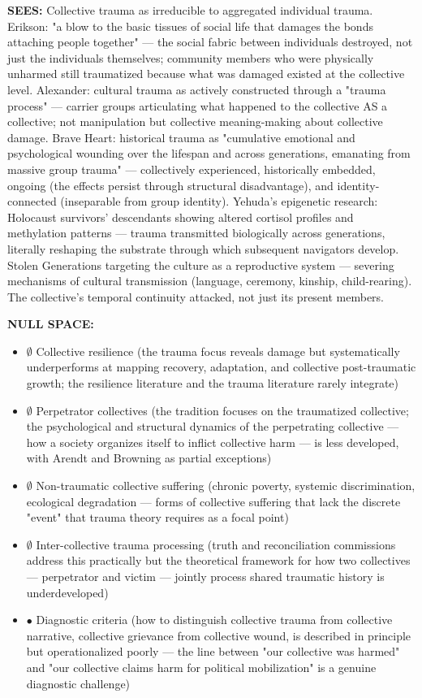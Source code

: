 \textbf{SEES:} Collective trauma as irreducible to aggregated individual trauma. Erikson: "a blow to the basic tissues of social life that damages the bonds attaching people together" — the social fabric between individuals destroyed, not just the individuals themselves; community members who were physically unharmed still traumatized because what was damaged existed at the collective level. Alexander: cultural trauma as actively constructed through a "trauma process" — carrier groups articulating what happened to the collective AS a collective; not manipulation but collective meaning-making about collective damage. Brave Heart: historical trauma as "cumulative emotional and psychological wounding over the lifespan and across generations, emanating from massive group trauma" — collectively experienced, historically embedded, ongoing (the effects persist through structural disadvantage), and identity-connected (inseparable from group identity). Yehuda's epigenetic research: Holocaust survivors' descendants showing altered cortisol profiles and methylation patterns — trauma transmitted biologically across generations, literally reshaping the substrate through which subsequent navigators develop. Stolen Generations targeting the culture as a reproductive system — severing mechanisms of cultural transmission (language, ceremony, kinship, child-rearing). The collective's temporal continuity attacked, not just its present members.


\textbf{NULL SPACE:}

\begin{itemize}[nosep,leftmargin=*]
  \item $\emptyset$ Collective resilience (the trauma focus reveals damage but systematically underperforms at mapping recovery, adaptation, and collective post-traumatic growth; the resilience literature and the trauma literature rarely integrate)
  \item $\emptyset$ Perpetrator collectives (the tradition focuses on the traumatized collective; the psychological and structural dynamics of the perpetrating collective — how a society organizes itself to inflict collective harm — is less developed, with Arendt and Browning as partial exceptions)
  \item $\emptyset$ Non-traumatic collective suffering (chronic poverty, systemic discrimination, ecological degradation — forms of collective suffering that lack the discrete "event" that trauma theory requires as a focal point)
  \item $\emptyset$ Inter-collective trauma processing (truth and reconciliation commissions address this practically but the theoretical framework for how two collectives — perpetrator and victim — jointly process shared traumatic history is underdeveloped)
  \item $\bullet$ Diagnostic criteria (how to distinguish collective trauma from collective narrative, collective grievance from collective wound, is described in principle but operationalized poorly — the line between "our collective was harmed" and "our collective claims harm for political mobilization" is a genuine diagnostic challenge)
\end{itemize}


